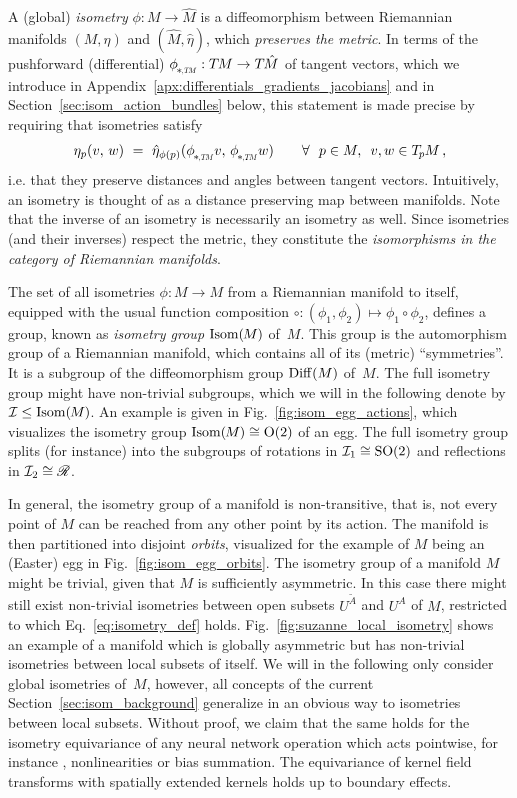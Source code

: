 A (global) \emph{isometry} $\phi: M \to \hat{M}$ is a diffeomorphism between Riemannian manifolds $(M,\eta)$ and $(\hat{M},\hat{\eta})$, which \emph{preserves the metric}.
In terms of the pushforward (differential) $\dphiTM: \TM \to T\mkern-1.5mu\hat{M}$ of tangent vectors, which we introduce in Appendix~\ref{apx:differentials_gradients_jacobians} and in Section~\ref{sec:isom_action_bundles} below, this statement is made precise by requiring that isometries satisfy
\begin{align}\label{eq:isometry_def}
    \eta_p(v,\, w)\ =\ \hat{\eta}_{\phi(p)}( \dphiTM v,\, \dphiTM w) \qquad \forall\ \ p\in M,\,\ v,w\in \TpM \,,
\end{align}
i.e. that they preserve distances and angles between tangent vectors.
Intuitively, an isometry is thought of as a distance preserving map between manifolds.
Note that the inverse of an isometry is necessarily an isometry as well.
Since isometries (and their inverses) respect the metric, they constitute the \emph{isomorphisms in the category of Riemannian manifolds}.


The set of all isometries $\phi: M \to M$ from a Riemannian manifold to itself, equipped with the usual function composition $\circ: (\phi_1, \phi_2) \mapsto \phi_1 \circ \phi_2$, defines a group, known as \emph{isometry group} $\operatorname{Isom}(\mkern-1.5mu M \mkern-.5mu)$ of~$M$.
This group is the automorphism group of a Riemannian manifold, which contains all of its (metric) ``symmetries''.
It is a subgroup of the diffeomorphism group $\operatorname{Diff}(M)$ of~$M$.
The full isometry group might have non-trivial subgroups, which we will in the following denote by $\mathcal{I} \leq \operatorname{Isom}(\mkern-1.5mu M \mkern-.5mu)$.
An example is given in Fig.~\ref{fig:isom_egg_actions}, which visualizes the isometry group $\operatorname{Isom}(\mkern-1.5mu M \mkern-.5mu) \cong \operatorname{O}(2)$ of an egg.
The full isometry group splits (for instance) into the subgroups of rotations in $\mathcal{I}_1 \cong \operatorname{SO}(2)$ and reflections in $\mathcal{I}_2 \cong \mathscr{R}$.


In general, the isometry group of a manifold is non-transitive, that is, not every point of $M$ can be reached from any other point by its action.
The manifold is then partitioned into disjoint \emph{orbits}, visualized for the example of $M$ being an (Easter) egg in Fig.~\ref{fig:isom_egg_orbits}.
The isometry group of a manifold $M$ might be trivial, given that $M$ is sufficiently asymmetric.
In this case there might still exist non-trivial isometries between open subsets $U^{\widetilde{A}}$ and $U^A$ of $M$, restricted to which Eq.~\eqref{eq:isometry_def} holds.
Fig.~\ref{fig:suzanne_local_isometry} shows an example of a manifold which is globally asymmetric but has non-trivial isometries between local subsets of itself.
We will in the following only consider global isometries of~$M$, however, all concepts of the current Section~\ref{sec:isom_background} generalize in an obvious way to isometries between local subsets.
Without proof, we claim that the same holds for the isometry equivariance of any neural network operation which acts pointwise, for instance \onexones, nonlinearities or bias summation.
The equivariance of kernel field transforms with spatially extended kernels holds up to boundary effects.

